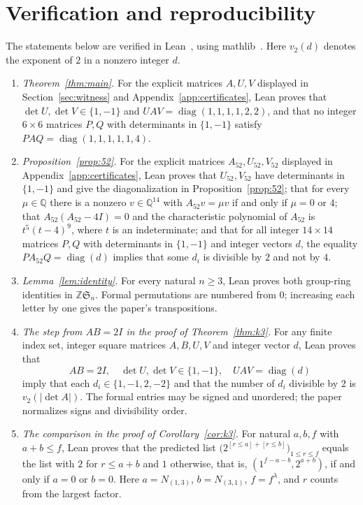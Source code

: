 \documentclass[11pt]{article}
\theoremstyle{remark}
\newcommand{\Z}{\mathbb{Z}}
\newcommand{\Q}{\mathbb{Q}}
\begin{document}
\section{Verification and reproducibility}\label{sec:verify}
The statements below are verified in Lean~\cite{lean}, using
mathlib~\cite{mathlib}. Here $v_2(d)$ denotes the exponent of $2$ in a nonzero
integer $d$.
\begin{enumerate}
\item \emph{Theorem~\ref{thm:main}.} For the explicit matrices $A,U,V$
displayed in Section~\ref{sec:witness} and Appendix~\ref{app:certificates},
Lean proves that $\det U,\det V\in\{1,-1\}$ and
$UAV=\operatorname{diag}(1,1,1,1,2,2)$, and that no integer $6\times6$
matrices $P,Q$ with determinants in $\{1,-1\}$ satisfy
$PAQ=\operatorname{diag}(1,1,1,1,1,4)$.
\item \emph{Proposition~\ref{prop:52}.} For the explicit matrices
$A_{52},U_{52},V_{52}$ displayed in Appendix~\ref{app:certificates}, Lean
proves that $U_{52},V_{52}$ have determinants in $\{1,-1\}$ and give the
diagonalization in Proposition~\ref{prop:52}; that for every $\mu\in\Q$ there
is a nonzero $v\in\Q^{14}$ with $A_{52}v=\mu v$ if and only if $\mu=0$ or $4$;
that $A_{52}(A_{52}-4I)=0$ and the characteristic polynomial of $A_{52}$ is
$t^5(t-4)^9$, where $t$ is an indeterminate; and that for all integer
$14\times14$ matrices $P,Q$ with determinants in $\{1,-1\}$ and integer
vectors $d$, the equality $PA_{52}Q=\operatorname{diag}(d)$ implies that some
$d_i$ is divisible by $2$ and not by $4$.
\item \emph{Lemma~\ref{lem:identity}.} For every natural $n\ge3$, Lean proves
both group-ring identities in $\Z\mathfrak S_n$. Formal permutations are
numbered from $0$; increasing each letter by one gives the paper's
transpositions.
\item \emph{The step from $AB=2I$ in the proof of Theorem~\ref{thm:k3}.} For
any finite index set, integer square matrices $A,B,U,V$ and integer vector
$d$, Lean proves that
\[
 AB=2I,\quad \det U,\det V\in\{1,-1\},\quad UAV=\operatorname{diag}(d)
\]
imply that each $d_i\in\{1,-1,2,-2\}$ and that the number of $d_i$ divisible
by $2$ is $v_2(|\det A|)$. The formal entries may be signed and unordered; the
paper normalizes signs and divisibility order.
\item \emph{The comparison in the proof of Corollary~\ref{cor:k3}.} For
natural $a,b,f$ with $a+b\le f$, Lean proves that the predicted list
$\bigl(2^{[r\le a]+[r\le b]}\bigr)_{1\le r\le f}$ equals the list with $2$ for
$r\le a+b$ and $1$ otherwise, that is, $(1^{f-a-b},2^{a+b})$, if and only if
$a=0$ or $b=0$. Here $a=N_{(1,3)}$, $b=N_{(3,1)}$, $f=f^\lambda$, and $r$
counts from the largest factor.
\end{enumerate}
\end{document}
